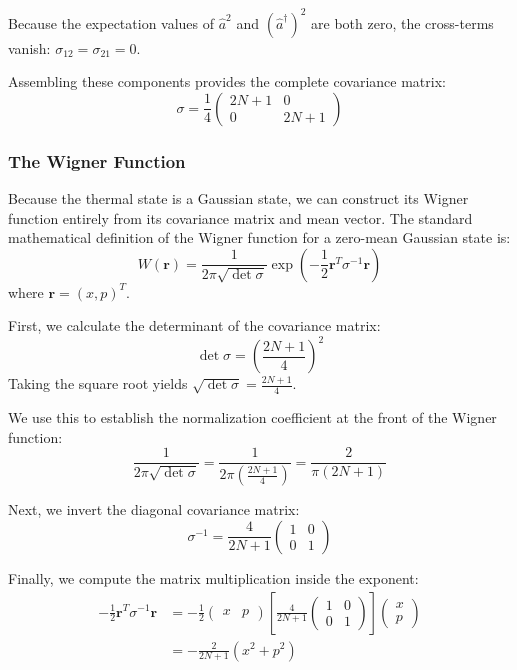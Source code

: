 {Because the expectation values of $\hat{a}^2$ and $(\hat{a}^{\dagger})^2$ are both zero, the cross-terms vanish: $\sigma_{12} = \sigma_{21} = 0$. 

Assembling these components provides the complete covariance matrix:
\begin{equation}
    \sigma = \frac{1}{4}\begin{pmatrix} 2N+1 & 0 \\ 0 & 2N+1 \end{pmatrix}
    \label{eq:eq296b}
\end{equation}

\subsubsection{The Wigner Function}
Because the thermal state is a Gaussian state, we can construct its Wigner function entirely from its covariance matrix and mean vector. The standard mathematical definition of the Wigner function for a zero-mean Gaussian state is:
\begin{equation*}
    W(\mathbf{r}) = \frac{1}{2\pi \sqrt{\det \sigma}} \exp\left(-\frac{1}{2} \mathbf{r}^T \sigma^{-1} \mathbf{r}\right)
\end{equation*}
where $\mathbf{r} = (x, p)^T$.

First, we calculate the determinant of the covariance matrix:
\begin{equation*}
    \det\sigma = \left(\frac{2N+1}{4}\right)^2
\end{equation*}
Taking the square root yields $\sqrt{\det\sigma} = \frac{2N+1}{4}$. 

We use this to establish the normalization coefficient at the front of the Wigner function:
\begin{equation*}
    \frac{1}{2\pi \sqrt{\det \sigma}} = \frac{1}{2\pi \left(\frac{2N+1}{4}\right)} = \frac{2}{\pi(2N+1)}
\end{equation*}

Next, we invert the diagonal covariance matrix:
\begin{equation*}
    \sigma^{-1} = \frac{4}{2N+1}\begin{pmatrix} 1 & 0 \\ 0 & 1 \end{pmatrix}
\end{equation*}

Finally, we compute the matrix multiplication inside the exponent:
\begin{align*}
    -\frac{1}{2} \mathbf{r}^T \sigma^{-1} \mathbf{r} &= -\frac{1}{2} \begin{pmatrix} x & p \end{pmatrix} \left[ \frac{4}{2N+1}\begin{pmatrix} 1 & 0 \\ 0 & 1 \end{pmatrix} \right] \begin{pmatrix} x \\ p \end{pmatrix} \nonumber \\
    &= -\frac{2}{2N+1} (x^2 + p^2)
\end{align*}

}
